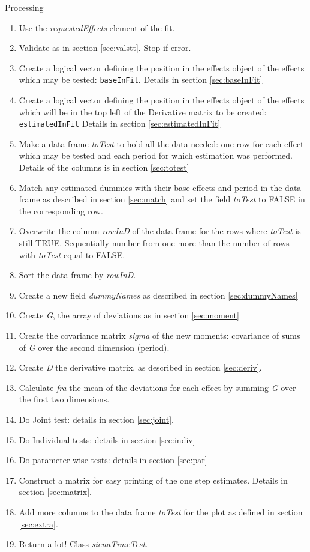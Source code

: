 \documentclass[12pt,a4paper]{article}
\makeatletter
\renewcommand{\=}{\,=\,}
\newcommand{\+}{\,+\,}
\newcommand{\nnm}[1]{\textsf{\small\textit{#1}}}
\renewcommand{\subsection}{\@startsection{subsection}{2}
                {0pt}{0.7\baselineskip}{0.3\baselineskip}
                {\sffamily} }
\makeatother
\begin{document}
\subsection{Processing}
\begin{enumerate}
\item Use the \nnm{requestedEffects} element of the fit.
\item Validate as in section \ref{sec:valstt}. Stop if error.
\item Create a logical vector defining the position in the effects object of the
  effects which may be tested: \verb|baseInFit|. Details in section
  \ref{sec:baseInFit}
\item Create a logical vector defining the position in the effects object of the
  effects which will be in the top left of the Derivative matrix to be created:
  \verb|estimatedInFit| Details in section \ref{sec:estimatedInFit}
\item Make a data frame \nnm{toTest} to hold all the data needed: one row for
  each effect which may be tested and each period for which estimation was
  performed. Details of the columns is in section \ref{sec:totest}
\item Match any estimated dummies with their base effects and period in the data
  frame as described in section \ref{sec:match} and set the field
  \nnm{toTest} to FALSE in the corresponding row.
\item Overwrite the column \nnm{rowInD} of the data frame for the rows where
  \nnm{toTest} is still TRUE.  Sequentially number from one more than the number
  of rows with \nnm{toTest} equal to FALSE.
\item Sort the data frame by \nnm{rowInD}.
\item Create a new field \nnm{dummyNames} as described in section
  \ref{sec:dummyNames}
\item Create \nnm{G}, the array of deviations as in section \ref{sec:moment}
\item Create the covariance matrix \nnm{sigma} of the new moments:
covariance of sums of \nnm{G} over the second dimension (period).
\item Create \nnm{D} the derivative matrix, as described in section
\ref{sec:deriv}.
\item Calculate \nnm{fra} the mean of the deviations for each effect by summing
\nnm{G} over the first two dimensions.
\item Do Joint test: details in section \ref{sec:joint}.
\item Do Individual tests: details in section \ref{sec:indiv}
\item Do parameter-wise tests: details in section \ref{sec:par}
\item Construct a matrix for easy printing of the one step estimates. Details in
  section \ref{sec:matrix}.
\item Add more columns to the data frame \nnm{toTest} for the plot as defined in
  section \ref{sec:extra}.
\item Return a lot! Class \nnm{sienaTimeTest}.
\end{enumerate}
\end{document}

